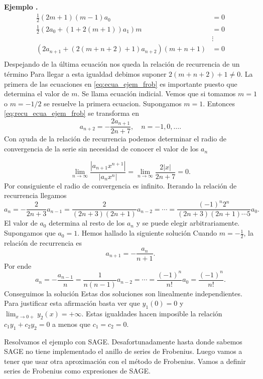 \documentclass{article}
\newcounter{defi_cont}
\newcounter{lem_cont}
\newcounter{ejem_cont}
\newenvironment{ejemplo}[1]{\refstepcounter{ejem_cont}\vspace{1ex}\noindent\textbf{Ejemplo \arabic{ejem_cont}.} #1}{}
\begin{document}
\begin{ejemplo}
\begin{equation}\label{eq:ecua_ejem_frob}
    \begin{split}
      \frac12\left(2m+1\right)(m-1) a_0&=0\\
       \frac{1}{2}  \left(   2 a_{0} + (1+2(m+1)) a_{1}\right)m&=0\\
                                      &\vdots\\
     \left(   2a_{n+1}+ (2(m+n+2)+1)a_{n+2}  \right)(m+n+1) &=0\\
    \end{split}
\end{equation}
Despejando de la última ecuación nos queda la relación de recurrencia de un término
Para llegar a esta igualdad debimos suponer $2(m+n+2)+1\neq 0$. 
La primera de las ecuaciones en \eqref{eq:ecua_ejem_frob} es importante puesto que determina el valor de $m$. Se llama ecuación indicial. Vemos que si tomamos $m=1$ o $m=-1/2$ se resuelve la primera ecuacion. Supongamos $m=1$. Entonces \eqref{eq:recu_ecua_ejem_frob} se transforma en
\[
a_{n+2}=-\frac{2a_{n+1}}{2n+7},\quad n=-1,0,\ldots.
\]
Con ayuda de la relación de recurrencia podemos determinar el radio de convergencia de la serie sin necesidad de conocer el valor de los $a_n$

\[\lim_{n\to\infty}\frac{|a_{n+1}x^{n+1}|}{|a_{n}x^{n}|}=
\lim_{n\to\infty}\frac{2|x|}{2n+7}=0.\]
Por consiguiente el radio de convergencia es infinito.  Iterando la relación de recurrencia llegamos 
\[a_{n}=-\frac{2}{2n+3}a_{n-1}=\frac{2}{(2n+3)(2n+1)}a_{n-2}=\cdots=
\frac{(-1)^n2^{n}}{(2n+3)(2n+1)\cdots 5}a_0.\]
El valor de $a_0$ determina al resto de los $a_n$ y se puede elegir arbitrariamente. Supongamos que $a_0=1$. Hemos hallado la siguiente solución  
Cuando $m=-\frac12$, la relación de recurrencia es
\[a_{n+1}=-\frac{a_{n}}{n+1}.\]
Por ende
\[a_n=-\frac{a_{n-1}}{n}=\frac{1}{n(n-1)}a_{n-2}=\cdots=\frac{(-1)^n}{n!}a_{0}=\frac{(-1)^n}{n!}.\]
Conseguimos la solución
Estas dos soluciones son linealmente independientes. Para justificar esta afirmación basta ver que $y_1(0)=0$ y $\lim_{x\to 0+}y_2(x)=+\infty$. Estas igualdades hacen imposible la relación $c_1y_1+c_2y_2=0$ a menos que $c_1=c_2=0$.

Resolvamos el ejemplo con SAGE. Desafortunadamente hasta donde sabemos SAGE no tiene implementado el anillo de series de Frobenius. Luego vamos a tener que usar otra aproximación  con el método de Frobenius. Vamos a definir series de Frobenius como expresiones de SAGE. 


\end{ejemplo}
\end{document}
